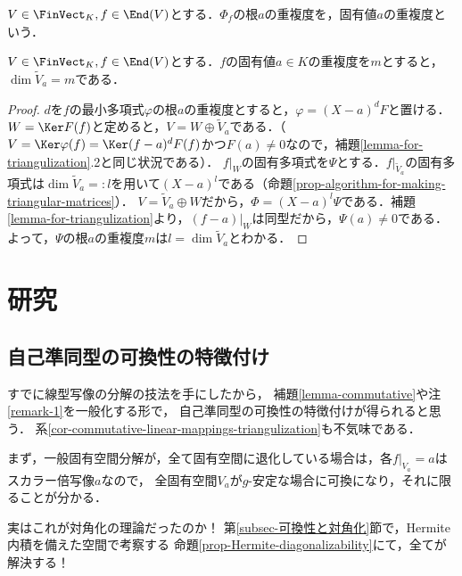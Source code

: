 \documentclass[uplatex, dvipdfmx]{jsreport}
\begin{document}
\begin{definition}
    $V\in\FinVect_K,f\in\End(V)$とする．$\Phi_f$の根$a$の重複度を，固有値$a$の重複度という．
\end{definition}

\begin{proposition}
    $V\in\FinVect_K,f\in\End(V)$とする．$f$の固有値$a\in K$の重複度を$m$とすると，$\dim\widetilde{V}_{a}=m$である．
\end{proposition}
\begin{proof}
    $d$を$f$の最小多項式$\varphi$の根$a$の重複度とすると，$\varphi=(X-a)^dF$と置ける．$W=\Ker F(f)$と定めると，$V=W\oplus\widetilde{V}_a$である．（$V=\Ker\varphi(f)=\Ker(f-a)^dF(f)$かつ$F(a)\ne 0$なので，補題\ref{lemma-for-triangulization}.2と同じ状況である）．
    $f|_W$の固有多項式を$\Psi$とする．$f|_{\widetilde{V}_a}$の固有多項式は$\dim\widetilde{V}_a=:l$を用いて$(X-a)^l$である（命題\ref{prop-algorithm-for-making-triangular-matrices}）．
    $V=\widetilde{V}_a\oplus W$だから，$\Phi=(X-a)^l\Psi$である．補題\ref{lemma-for-triangulization}より，$(f-a)|_W$は同型だから，$\Psi(a)\ne 0$である．よって，$\Psi$の根$a$の重複度$m$は$l=\dim\widetilde{V}_a$とわかる．
\end{proof}

\section{研究}

\subsection{自己準同型の可換性の特徴付け}

\begin{tcolorbox}[colframe=ForestGreen, colback=ForestGreen!10!white, breakable]
    すでに線型写像の分解の技法を手にしたから，
    補題\ref{lemma-commutative}や注\ref{remark-1}を一般化する形で，
    自己準同型の可換性の特徴付けが得られると思う．
    系\ref{cor-commutative-linear-mappings-triangulization}も不気味である．
    
    まず，一般固有空間分解が，全て固有空間に退化している場合は，各$f|_{V_a}=a$はスカラー倍写像$a$なので，
    全固有空間$V_a$が$g$-安定な場合に可換になり，それに限ることが分かる．

    実はこれが対角化の理論だったのか！
    第\ref{subsec-可換性と対角化}節で，Hermite内積を備えた空間で考察する
    命題\ref{prop-Hermite-diagonalizability}にて，全てが解決する！
\end{tcolorbox}
\end{document}
